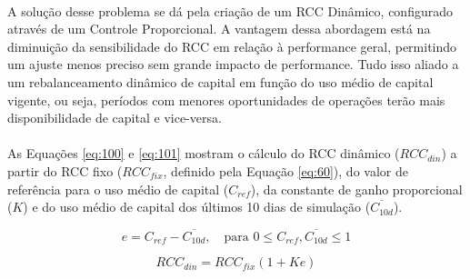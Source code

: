 \paragraph{} A solução desse problema se dá pela criação de um RCC Dinâmico, configurado através de um Controle Proporcional. A vantagem dessa abordagem está na diminuição da sensibilidade do RCC em relação à performance geral, permitindo um ajuste menos preciso sem grande impacto de performance. Tudo isso aliado a um rebalanceamento dinâmico de capital em função do uso médio de capital vigente, ou seja, períodos com menores oportunidades de operações terão mais disponibilidade de capital e vice-versa.


\paragraph{} As Equações \ref{eq:100} e \ref{eq:101} mostram o cálculo do RCC dinâmico (\begin{math} RCC_{din} \end{math}) a partir do RCC fixo (\begin{math} RCC_{fix} \end{math}, definido pela Equação \ref{eq:60}), do valor de referência para o uso médio de capital (\begin{math} C_{ref} \end{math}), da constante de ganho proporcional (\begin{math} K \end{math}) e do uso médio de capital dos últimos 10 dias de simulação (\begin{math} \overline{C_{10d}} \end{math}).

\begin{equation} \label{eq:100}
    e = C_{ref} - \overline{C_{10d}}, \quad \mbox{para } 0 \le C_{ref}, \overline{C_{10d}} \le 1
\end{equation}

\begin{equation} \label{eq:101}
    RCC_{din} = RCC_{fix} (1 + K e)
\end{equation}

